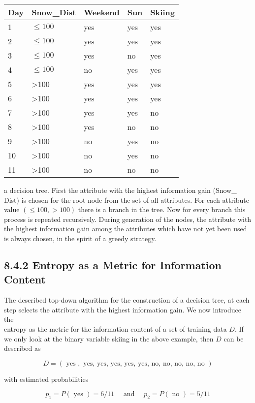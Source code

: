 \documentclass[10pt]{article}
\begin{document}
\begin{center}
\begin{tabular}{|l|l|l|l|l|}
\hline
Day & Snow\_Dist & Weekend & Sun & Skiing \\
\hline
1 & $\leq 100$ & yes & yes & yes \\
\hline
2 & $\leq 100$ & yes & yes & yes \\
\hline
3 & $\leq 100$ & yes & no & yes \\
\hline
4 & $\leq 100$ & no & yes & yes \\
\hline
5 & >100 & yes & yes & yes \\
\hline
6 & >100 & yes & yes & yes \\
\hline
7 & >100 & yes & yes & no \\
\hline
8 & >100 & yes & no & no \\
\hline
9 & >100 & no & yes & no \\
\hline
10 & >100 & no & yes & no \\
\hline
11 & >100 & no & no & no \\
\hline
\end{tabular}
\end{center}

a decision tree. First the attribute with the highest information gain (Snow\_ Dist) is chosen for the root node from the set of all attributes. For each attribute value $(\leq 100,>100)$ there is a branch in the tree. Now for every branch this process is repeated recursively. During generation of the nodes, the attribute with the highest information gain among the attributes which have not yet been used is always chosen, in the spirit of a greedy strategy.

\subsection*{8.4.2 Entropy as a Metric for Information Content}
The described top-down algorithm for the construction of a decision tree, at each step selects the attribute with the highest information gain. We now introduce the\\
entropy as the metric for the information content of a set of training data $D$. If we only look at the binary variable skiing in the above example, then $D$ can be described as

$$
D=(\text { yes }, \text { yes, yes, yes, yes, yes, no, no, no, no, no })
$$

with estimated probabilities

$$
p_{1}=P(\text { yes })=6 / 11 \quad \text { and } \quad p_{2}=P(\text { no })=5 / 11
$$
\end{document}
